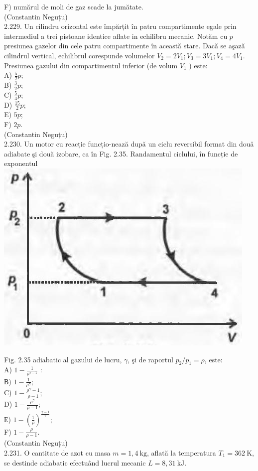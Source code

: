 \documentclass[10pt]{article}
\begin{document}
F) numărul de moli de gaz scade la jumătate.\\
(Constantin Neguțu)\\
2.229. Un cilindru orizontal este împărțit în patru compartimente egale prin intermediul a trei pistoane identice aflate in echilibru mecanic. Notăm cu $p$ presiunea gazelor din cele patru compartimente în această stare. Dacă se aşază cilindrul vertical, echilibrul corespunde volumelor $V_{2}=2 V_{1} ; V_{3}=3 V_{1} ; V_{4}=4 V_{1}$. Presiunea gazului din compartimentul inferior (de volum $V_{1}$ ) este:\\
A) $\frac{5}{2} p$;\\
B) $\frac{3}{2} p$;\\
C) $\frac{5}{4} p$;\\
D) $\frac{15}{2} p$;\\
E) $5 p$;\\
F) $2 p$.\\
(Constantin Neguțu)\\
2.230. Un motor cu reacție funcțio-nează după un ciclu reversibil format din două adiabate şi două izobare, ca în Fig. 2.35. Randamentul ciclului, în funcție de exponentul\\
\includegraphics[max width=\textwidth, center]{2025_07_01_5b3ff9fa0d508c8e9f17g-125}

Fig. 2.35 adiabatic al gazului de lucru, $\gamma$, şi de raportul $p_{2} / p_{1}=\rho$, este:\\
A) $1-\frac{1}{\rho^{\gamma-1}}$ :\\
В) $1-\frac{1}{\rho^{\gamma}}$;\\
C) $1-\frac{\rho^{\gamma}-1}{\rho-1}$;\\
D) $1-\frac{\rho^{\gamma}}{\rho-1}$;\\
Е) $1-\left(\frac{1}{\rho}\right)^{\frac{\gamma-1}{\gamma}}$;\\
F) $1-\frac{\rho}{\rho-1}$.\\
(Constantin Neguțu)\\
2.231. O cantitate de azot cu masa $m=1,4 \mathrm{~kg}$, aflată la temperatura $T_{1}=362 \mathrm{~K}$, se destinde adiabatic efectuând lucrul mecanic $L=8,31 \mathrm{~kJ}$.
\end{document}
